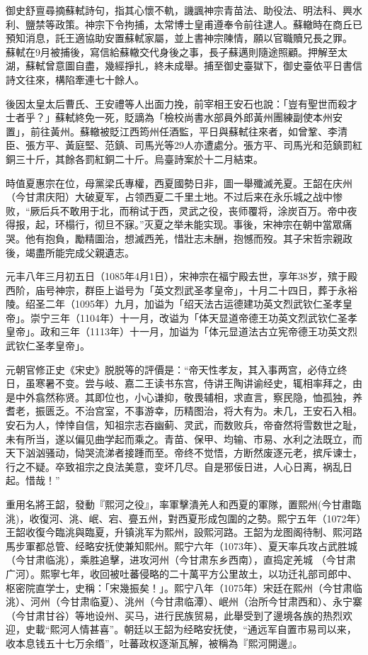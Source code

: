 御史舒亶尋摘蘇軾詩句，指其心懷不軌，譏諷神宗青苗法、助役法、明法科、興水利、鹽禁等政策。神宗下令拘捕，太常博士皇甫遵奉令前往逮人。蘇轍時在商丘已預知消息，託王適協助安置蘇軾家屬，並上書神宗陳情，願以官職贖兄長之罪。 蘇軾在9月被捕後，寫信給蘇轍交代身後之事，長子蘇邁則隨途照顧。押解至太湖，蘇軾曾意圖自盡，幾經掙扎，終未成舉。捕至御史臺獄下，御史臺依平日書信詩文往來，構陷牽連七十餘人。

後因太皇太后曹氏、王安禮等人出面力挽，前宰相王安石也說：「豈有聖世而殺才士者乎？」蘇軾終免一死，貶謫為「檢校尚書水部員外郎黃州團練副使本州安置」，前往黃州。蘇轍被貶江西筠州任酒監，平日與蘇軾往來者，如曾鞏、李清臣、張方平、黃庭堅、范鎮、司馬光等29人亦遭處分。張方平、司馬光和范鎮罰紅銅三十斤，其餘各罰紅銅二十斤。烏臺詩案於十二月結束。

時值夏惠宗在位，母黨梁氏專權，西夏國勢日非，圖一舉殲滅羌夏。王韶在庆州（今甘肃庆阳）大破夏军，占领西夏二千里土地。不过后来在永乐城之战中惨败，“厥后兵不敢用于北，而稍试于西，灵武之役，丧师覆将，涂炭百万。帝中夜得报，起，环榻行，彻旦不寐。”灭夏之举未能实现。事後，宋神宗在朝中當眾痛哭。他有抱負，勵精圖治，想滅西羌，惜壯志未酬，抱憾而歿。其子宋哲宗親政後，竭盡所能完成父親遺志。

元丰八年三月初五日（1085年4月1日），宋神宗在福宁殿去世，享年38岁，殡于殿西阶，庙号神宗，群臣上谥号为「英文烈武圣孝皇帝」，十月二十四日，葬于永裕陵。绍圣二年（1095年）九月，加谥为「绍天法古运德建功英文烈武钦仁圣孝皇帝」。崇宁三年（1104年）十一月，改谥为「体天显道帝德王功英文烈武钦仁圣孝皇帝」。政和三年（1113年）十一月，加谥为「体元显道法古立宪帝德王功英文烈武钦仁圣孝皇帝」。

元朝官修正史《宋史》脱脱等的評價是：“帝天性孝友，其入事两宫，必侍立终日，虽寒暑不变。尝与岐、嘉二王读书东宫，侍讲王陶讲谕经史，辄相率拜之，由是中外翕然称贤。其即位也，小心谦抑，敬畏辅相，求直言，察民隐，恤孤独，养耆老，振匮乏。不治宫室，不事游幸，历精图治，将大有为。未几，王安石入相。安石为人，悻悻自信，知祖宗志吞幽蓟、灵武，而数败兵，帝奋然将雪数世之耻，未有所当，遂以偏见曲学起而乘之。青苗、保甲、均输、市易、水利之法既立，而天下汹汹骚动，恸哭流涕者接踵而至。帝终不觉悟，方断然废逐元老，摈斥谏士，行之不疑。卒致祖宗之良法美意，变坏几尽。自是邪佞日进，人心日离，祸乱日起。惜哉！”

重用名將王韶，發動『熙河之役』，率軍擊潰羌人和西夏的軍隊，置熙州(今甘肅臨洮)，收復河、洮、岷、宕、亹五州，對西夏形成包圍的之勢。熙宁五年（1072年）王韶收復今臨洮與臨夏，升镇洮军为熙州，設熙河路。王韶为龙图阁待制、熙河路馬步軍都总管、经略安抚使兼知熙州。熙宁六年（1073年）、夏天率兵攻占武胜城（今甘肃临洮），乘胜追擊，进攻河州（今甘肃东乡西南），直捣定羌城 （今甘肃广河）。熙寧七年，收回被吐蕃侵略的二十萬平方公里故土，以功迁礼部司郎中、枢密院直学士，史稱：「宋幾振矣！」。熙宁八年（1075年）宋廷在熙州（今甘肃临洮）、河州（今甘肃临夏）、洮州（今甘肃临潭）、岷州（治所今甘肃西和）、永宁寨（今甘肃甘谷）等地设州、买马，进行民族贸易，此舉受到了邊境各族的热烈欢迎，史載“熙河人情甚喜”。朝廷以王韶为经略安抚使，“通远军自置市易司以来，收本息钱五十七万余缗”，吐蕃政权逐渐瓦解，被稱為『熙河開邊』。

